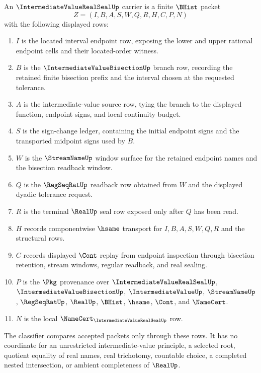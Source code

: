 \begin{definition}
\label{def:intermediate-value-real-seal-carrier}
An $\IntermediateValueRealSealUp$ carrier is a finite $\BHist$ packet
$$
Z=(I,B,A,S,W,Q,R,H,C,P,N)
$$
with the following displayed rows:
\begin{enumerate}
\item $I$ is the located interval endpoint row, exposing the lower and upper rational endpoint cells and their located-order witness.
\item $B$ is the $\IntermediateValueBisectionUp$ branch row, recording the retained finite bisection prefix and the interval chosen at the requested tolerance.
\item $A$ is the intermediate-value source row, tying the branch to the displayed function, endpoint signs, and local continuity budget.
\item $S$ is the sign-change ledger, containing the initial endpoint signs and the transported midpoint signs used by $B$.
\item $W$ is the $\StreamNameUp$ window surface for the retained endpoint names and the bisection readback window.
\item $Q$ is the $\RegSeqRatUp$ readback row obtained from $W$ and the displayed dyadic tolerance request.
\item $R$ is the terminal $\RealUp$ seal row exposed only after $Q$ has been read.
\item $H$ records componentwise $\hsame$ transport for $I,B,A,S,W,Q,R$ and the structural rows.
\item $C$ records displayed $\Cont$ replay from endpoint inspection through bisection retention, stream windows, regular readback, and real sealing.
\item $P$ is the $\Pkg$ provenance over $\IntermediateValueRealSealUp$, $\IntermediateValueBisectionUp$, $\IntermediateValueUp$, $\StreamNameUp$, $\RegSeqRatUp$, $\RealUp$, $\BHist$, $\hsame$, $\Cont$, and $\NameCert$.
\item $N$ is the local $\NameCert_{\IntermediateValueRealSealUp}$ row.
\end{enumerate}
The classifier compares accepted packets only through these rows. It has no coordinate for an unrestricted intermediate-value principle, a selected root, quotient equality of real names, real trichotomy, countable choice, a completed nested intersection, or ambient completeness of $\RealUp$.
\end{definition}

